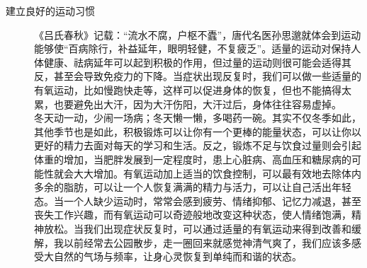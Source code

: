 \documentclass[fontset=founder]{ctexart}
\begin{document}
\begin{description}
    \item[建立良好的运动习惯] 《吕氏春秋》记载：“流水不腐，户枢不蠹”，唐代名医孙思邈就体会到运动能够使“百病除行，补益延年，眼明轻健，不复疲乏”。适量的运动对保持人体健康、祛病延年可以起到积极的作用，但过量的运动则很可能会适得其反，甚至会导致免疫力的下降。当症状出现反复时，我们可以做一些适量的有氧运动，比如慢跑快走等，这样可以促进身体的恢复，但也不能搞得太累，也要避免出大汗，因为大汗伤阳，大汗过后，身体往往容易虚掉。\\ 冬天动一动，少闹一场病；冬天懒一懒，多喝药一碗。其实不仅冬季如此，其他季节也是如此，积极锻炼可以让你有一个更棒的能量状态，可以让你以更好的精力去面对每天的学习和生活。反之，锻炼不足与饮食过量则会引起体重的增加，当肥胖发展到一定程度时，患上心脏病、高血压和糖尿病的可能性就会大大增加。有氧运动加上适当的饮食控制，可以最有效地去除体内多余的脂肪，可以让一个人恢复满满的精力与活力，可以让自己活出年轻态。当一个人缺少运动时，常常会感到疲劳、情绪抑郁、记忆力减退，甚至丧失工作兴趣，而有氧运动可以奇迹般地改变这种状态，使人情绪饱满，精神放松。当我们出现症状反复时，可以通过适量的有氧运动来得到改善和缓解，我以前经常去公园散步，走一圈回来就感觉神清气爽了，我们应该多感受大自然的气场与频率，让身心灵恢复到单纯而和谐的状态。

\end{description}
\end{document}
